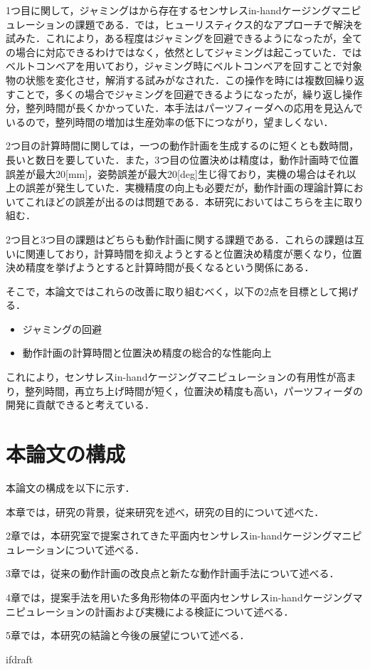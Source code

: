 \documentclass[a4paper,twoside,12pt,papersize, dvipdfmx]{iirthesis}
\begin{document}
1つ目に関して，ジャミングは\cite{asamura2013}から存在するセンサレスin-handケージングマニピュレーションの課題である．\cite{komiyama2021}では，ヒューリスティクス的なアプローチで解決を試みた．これにより，ある程度はジャミングを回避できるようになったが，全ての場合に対応できるわけではなく，依然としてジャミングは起こっていた．\cite{kamikukita2022}ではベルトコンベアを用いており，ジャミング時にベルトコンベアを回すことで対象物の状態を変化させ，解消する試みがなされた．この操作を時には複数回繰り返すことで，多くの場合でジャミングを回避できるようになったが，繰り返し操作分，整列時間が長くかかっていた．本手法はパーツフィーダへの応用を見込んでいるので，整列時間の増加は生産効率の低下につながり，望ましくない．

2つ目の計算時間に関しては，一つの動作計画を生成するのに短くとも数時間，長いと数日を要していた．また，3つ目の位置決めは精度は，動作計画時で位置誤差が最大20[mm]，姿勢誤差が最大20[deg]生じ得ており，実機の場合はそれ以上の誤差が発生していた．実機精度の向上も必要だが，動作計画の理論計算においてこれほどの誤差が出るのは問題である．本研究においてはこちらを主に取り組む．

2つ目と3つ目の課題はどちらも動作計画に関する課題である．これらの課題は互いに関連しており，計算時間を抑えようとすると位置決め精度が悪くなり，位置決め精度を挙げようとすると計算時間が長くなるという関係にある．

そこで，本論文ではこれらの改善に取り組むべく，以下の2点を目標として掲げる．
\begin{itemize}
\item ジャミングの回避
\item 動作計画の計算時間と位置決め精度の総合的な性能向上
\end{itemize}
これにより，センサレスin-handケージングマニピュレーションの有用性が高まり，整列時間，再立ち上げ時間が短く，位置決め精度も高い，パーツフィーダの開発に貢献できると考えている．

\section{本論文の構成}\label{sec::intro::configuration}
本論文の構成を以下に示す．\par
本章では，研究の背景，従来研究を述べ，研究の目的について述べた．\par
2章では，本研究室で提案されてきた平面内センサレスin-handケージングマニピュレーションについて述べる．\par
3章では，従来の動作計画の改良点と新たな動作計画手法について述べる．\par
4章では，提案手法を用いた多角形物体の平面内センサレスin-handケージングマニピュレーションの計画および実機による検証について述べる．\par
5章では，本研究の結論と今後の展望について述べる．


\expandafter\ifx\csname ifdraft\endcsname\relax
    
\end{document}

